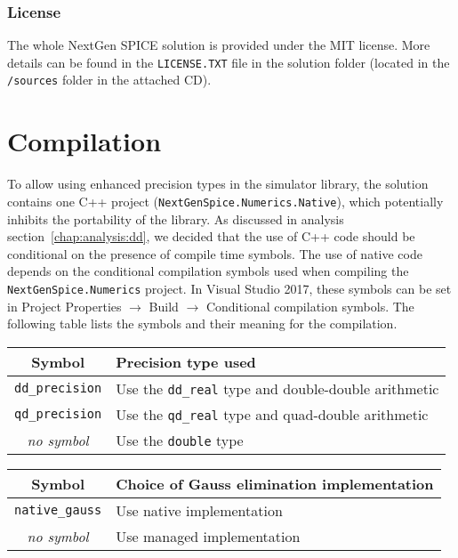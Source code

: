 \subsubsection{License}
The whole NextGen SPICE solution is provided under the MIT license. More details can be found in the \texttt{LICENSE.TXT} file in the solution folder (located in the \texttt{/sources} folder in the attached CD).

\section{Compilation}

To allow using enhanced precision types in the simulator library, the solution contains one C++ project (\texttt{NextGenSpice.Numerics.Native}), which potentially inhibits the portability of the library. As discussed in analysis section~\ref{chap:analysis:dd}, we decided that the use of C++ code should be conditional on the presence of compile time symbols. The use of native code depends on the conditional compilation symbols used when compiling the \texttt{NextGenSpice.Numerics} project. In Visual Studio 2017, these symbols can be set in Project Properties $\rightarrow$ Build $\rightarrow$ Conditional compilation symbols. The following table lists the symbols and their meaning for the compilation.


\begin{center}
	\begin{tabular}{|c|L|}
		\hline 
		Symbol & Precision type used \\ \hline \hline
		\texttt{dd\_precision}& Use the \texttt{dd\_real} type and double-double arithmetic \\ \hline 
		\texttt{qd\_precision}& Use the \texttt{qd\_real} type and quad-double arithmetic \\ \hline 
		\textit{no symbol} & Use the \texttt{double} type \\ \hline 
	\end{tabular}
\end{center}

\begin{center}
	\begin{tabular}{|c|L|}
		\hline 
		Symbol & Choice of Gauss elimination implementation \\ \hline \hline
		\texttt{native\_gauss}& Use native implementation  \\ \hline 
		\textit{no symbol} & Use managed implementation \\ \hline 
	\end{tabular}
\end{center}

